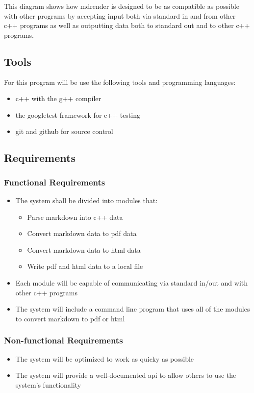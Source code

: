 This diagram shows how mdrender is designed to be as compatible as possible with other programs by accepting input both via standard in and from other c++ programs as well as outputting data both to standard out and to other c++ programs.

\subsection{Tools}
For this program will be use the following tools and programming languages:
\begin{itemize}
	\item c++ with the g++ compiler
	\item the googletest framework for c++ testing
	\item git and github for source control
\end{itemize}



\subsection{Requirements}

\subsubsection{Functional Requirements}

\begin{itemize}
	\item The system shall be divided into modules that:
		\begin{itemize}
			\item Parse markdown into c++ data
			\item Convert markdown data to pdf data
			\item Convert markdown data to html data
			\item Write pdf and html data to a local file
		\end{itemize}
	\item Each module will be capable of communicating via standard in/out and with other c++ programs
	\item The system will include a command line program that uses all of the modules to convert markdown to pdf or html
\end{itemize}

\subsubsection{Non-functional Requirements}
\begin{itemize}
	\item The system will be optimized to work as quicky as possible
	\item The system will provide a well-documented api to allow others to use the system's functionality
\end{itemize}


